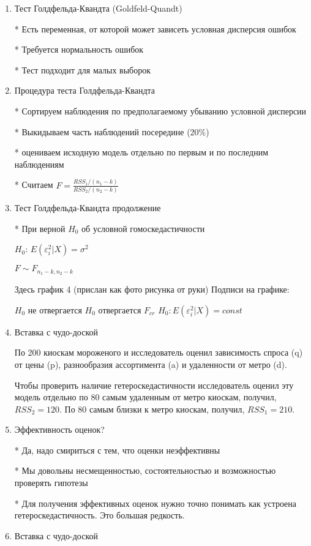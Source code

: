 \documentclass[12pt,a4paper]{article}
\begin{document}
{\begin{enumerate}
\newpage
\item Тест Голдфельда-Квандта (Goldfeld-Quandt)

* Есть переменная, от которой может зависеть условная дисперсия ошибок

* Требуется нормальность ошибок

* Тест подходит для малых выборок

\item Процедура теста Голдфельда-Квандта

* Сортируем наблюдения по предполагаемому убыванию условной дисперсии

* Выкидываем часть наблюдений посередине (20\%)

* оцениваем исходную модель отдельно по первым и по последним наблюдениям

* Считаем $F=\frac{RSS_1/(n_1-k)}{RSS_2/(n_2-k)}$

\newpage
\item Тест Голдфельда-Квандта продолжение

* При верной $H_0$ об условной гомоскедастичности

$H_0$: $E(\varepsilon^2_i|X)=\sigma^2$

$F\sim F_{n_1-k,n_2-k}$

Здесь график 4 (прислан как фото рисунка от руки)
Подписи на графике:

$H_0$ не отвергается
$H_0$ отвергается
$F_{cr}$
$H_0: E(\varepsilon_i^2 | X)=const$

\item Вставка с чудо-доской

По 200 киоскам мороженого и  исследователь оценил зависимость спроса (q) от цены (p), разнообразия ассортимента (a) и удаленности от метро (d).

Чтобы проверить наличие гетероскедастичности исследователь оценил эту модель отдельно по 80 самым удаленным от метро киоскам, получил, $RSS_2=120$. По 80 самым близки к метро киоскам, получил, $RSS_1=210$. 

\newpage
\item Эффективность оценок?

* Да, надо смириться с тем, что оценки неэффективны

* Мы довольны несмещенностью, состоятельностью и возможностью проверять гипотезы

* Для получения эффективных оценок нужно точно понимать как устроена гетероскедастичность. Это большая редкость.


\item Вставка с чудо-доской


\end{enumerate}}
\end{document}
